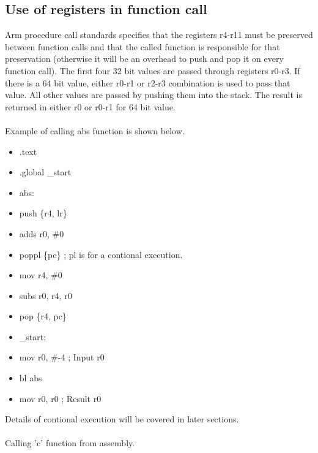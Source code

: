 \documentclass{article}
\begin{document}
	\subsection{Use of registers in function call}
	Arm procedure call standards specifies that the registers r4-r11 must be preserved between function calls and that the called function is responsible for that preservation (otherwise it will be an overhead to push and pop it on every function call). The first four 32 bit values are passed through registers r0-r3. If there is a 64 bit value, either r0-r1 or r2-r3 combination is used to pass that value. All other values are passed by pushing them into the stack. The result is returned in either r0 or r0-r1 for 64 bit value.\\\\
	Example of calling abs function is shown below.\\
	\begin{itemize}
	\item[] .text
	\item[] .global \_start
	\item[] abs:
	\item[]\qquad push \{r4, lr\}
	\item[]\qquad adds r0, \#0
	\item[]\qquad poppl \{pc\}	\qquad ; pl is for a contional execution.
	\item[]\qquad mov r4, \#0
	\item[]\qquad subs r0, r4, r0
	\item[]\qquad pop \{r4, pc\}	
	\item[] \_start:
	\item[]\qquad mov r0, \#-4 \qquad ; Input r0
	\item[]\qquad bl abs
	\item[]\qquad mov r0, r0 \qquad ; Result r0
	\end{itemize}
Details of contional execution will be covered in later sections.\\\\
Calling 'c' function from assembly.\\
\end{document}
